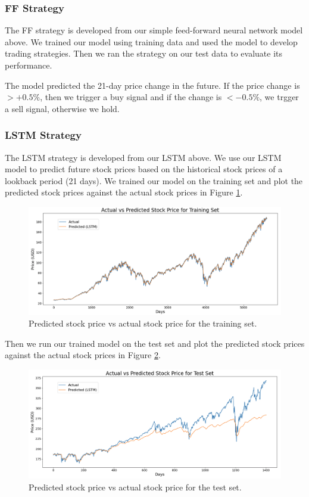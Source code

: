 \documentclass[10pt]{article}
\begin{document}
\subsubsection{FF Strategy}

The FF strategy is developed from our simple feed-forward neural network model above. We trained our model using training data and used the model to develop trading strategies. Then we ran the strategy on our test data to evaluate its performance.

The model predicted the 21-day price change in the future. If the price change is $> +0.5\%$, then we trigger a buy signal and if the change is $< -0.5\%$, we trgger a sell signal, otherwise we hold.


\subsubsection{LSTM Strategy}

The LSTM strategy is developed from our LSTM above. We use our LSTM model to predict future stock prices based on the historical stock prices of a lookback period (21 days). We trained our model on the training set and plot the predicted stock prices against the actual stock prices in Figure \ref{lstmtrain}.

\begin{figure}[H]
\centering
\includegraphics[width=\textwidth]{lstm-train}
\caption{Predicted stock price vs actual stock price for the training set.}
\label{lstmtrain}
\end{figure}


Then we run our trained model on the test set and plot the predicted stock prices against the actual stock prices in Figure \ref{lstmtest}.

\begin{figure}[H]
\centering
\includegraphics[width=\textwidth]{lstm-test}
\caption{Predicted stock price vs actual stock price for the test set.}
\label{lstmtest}
\end{figure}
\end{document}
